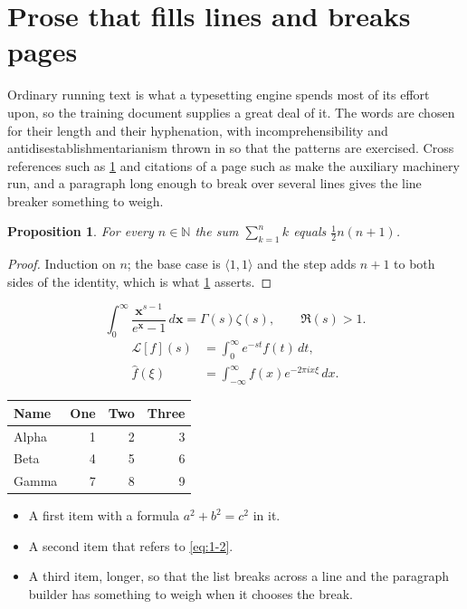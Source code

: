 \documentclass[11pt,a4paper]{report}
\theoremstyle{plain}
\newtheorem{proposition}{Proposition}[chapter]
\newcommand{\vecn}[1]{\mathbf{#1}}
\newcommand{\pairs}[2]{\langle #1,#2\rangle}
\begin{document}
\section{Prose that fills lines and breaks pages}
\label{sec:prose1-2}
Ordinary running text is what a typesetting engine spends most of its effort
upon, so the training document supplies a great deal of it. The words are
chosen for their length and their hyphenation, with incomprehensibility and
antidisestablishmentarianism thrown in so that the patterns are exercised.
Cross references such as \cref{sec:prose1-2} and citations of a page such
as \pageref{sec:prose1-2} make the auxiliary machinery run, and a
paragraph long enough to break over several lines gives the line breaker
something to weigh.
\begin{proposition}\label{prop:1-2}
For every $n\in\mathbb{N}$ the sum $\sum_{k=1}^{n}k$ equals
$\tfrac{1}{2}n(n+1)$.
\end{proposition}
\begin{proof}
Induction on $n$; the base case is $\pairs{1}{1}$ and the step adds $n+1$ to
both sides of the identity, which is what \cref{prop:1-2} asserts.
\end{proof}
\begin{equation}\label{eq:1-2}
  \int_{0}^{\infty}\frac{\vecn{x}^{s-1}}{e^{\vecn{x}}-1}\,d\vecn{x}
    = \Gamma(s)\zeta(s),\qquad \Re(s)>1 .
\end{equation}
\begin{align}
  \mathcal{L}[f](s) &= \int_{0}^{\infty} e^{-st} f(t)\,dt, \\
  \widehat{f}(\xi)  &= \int_{-\infty}^{\infty} f(x) e^{-2\pi i x\xi}\,dx .
\end{align}
\par\noindent\begin{center}
\begin{tabular}{lrrr}
\hline
Name & One & Two & Three \\
\hline
Alpha & 1 & 2 & 3 \\
Beta & 4 & 5 & 6 \\
Gamma & 7 & 8 & 9 \\
\hline
\end{tabular}
\end{center}
\begin{itemize}
  \item A first item with a formula $a^2+b^2=c^2$ in it.
  \item A second item that refers to \eqref{eq:1-2}.
  \item A third item, longer, so that the list breaks across a line and the
    paragraph builder has something to weigh when it chooses the break.
\end{itemize}
\end{document}
